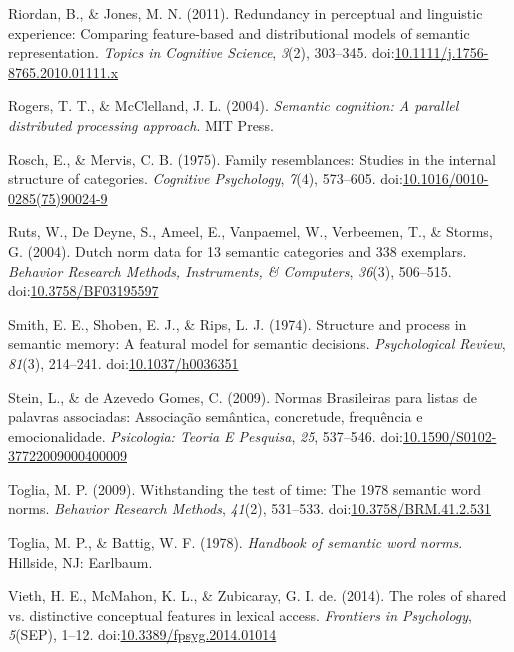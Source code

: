 \documentclass[english,,man]{apa6}
\begin{document}
\leavevmode\hypertarget{ref-Riordan2011}{}%
Riordan, B., \& Jones, M. N. (2011). Redundancy in perceptual and linguistic experience: Comparing feature-based and distributional models of semantic representation. \emph{Topics in Cognitive Science}, \emph{3}(2), 303--345. doi:\href{https://doi.org/10.1111/j.1756-8765.2010.01111.x}{10.1111/j.1756-8765.2010.01111.x}

\leavevmode\hypertarget{ref-Rogers2004}{}%
Rogers, T. T., \& McClelland, J. L. (2004). \emph{Semantic cognition: A parallel distributed processing approach}. MIT Press.

\leavevmode\hypertarget{ref-Rosch1975}{}%
Rosch, E., \& Mervis, C. B. (1975). Family resemblances: Studies in the internal structure of categories. \emph{Cognitive Psychology}, \emph{7}(4), 573--605. doi:\href{https://doi.org/10.1016/0010-0285(75)90024-9}{10.1016/0010-0285(75)90024-9}

\leavevmode\hypertarget{ref-Ruts2004}{}%
Ruts, W., De Deyne, S., Ameel, E., Vanpaemel, W., Verbeemen, T., \& Storms, G. (2004). Dutch norm data for 13 semantic categories and 338 exemplars. \emph{Behavior Research Methods, Instruments, \& Computers}, \emph{36}(3), 506--515. doi:\href{https://doi.org/10.3758/BF03195597}{10.3758/BF03195597}

\leavevmode\hypertarget{ref-Smith1974}{}%
Smith, E. E., Shoben, E. J., \& Rips, L. J. (1974). Structure and process in semantic memory: A featural model for semantic decisions. \emph{Psychological Review}, \emph{81}(3), 214--241. doi:\href{https://doi.org/10.1037/h0036351}{10.1037/h0036351}

\leavevmode\hypertarget{ref-Stein2009}{}%
Stein, L., \& de Azevedo Gomes, C. (2009). Normas Brasileiras para listas de palavras associadas: Associação semântica, concretude, frequência e emocionalidade. \emph{Psicologia: Teoria E Pesquisa}, \emph{25}, 537--546. doi:\href{https://doi.org/10.1590/S0102-37722009000400009}{10.1590/S0102-37722009000400009}

\leavevmode\hypertarget{ref-Toglia2009}{}%
Toglia, M. P. (2009). Withstanding the test of time: The 1978 semantic word norms. \emph{Behavior Research Methods}, \emph{41}(2), 531--533. doi:\href{https://doi.org/10.3758/BRM.41.2.531}{10.3758/BRM.41.2.531}

\leavevmode\hypertarget{ref-Toglia1978}{}%
Toglia, M. P., \& Battig, W. F. (1978). \emph{Handbook of semantic word norms}. Hillside, NJ: Earlbaum.

\leavevmode\hypertarget{ref-Vieth2014}{}%
Vieth, H. E., McMahon, K. L., \& Zubicaray, G. I. de. (2014). The roles of shared vs. distinctive conceptual features in lexical access. \emph{Frontiers in Psychology}, \emph{5}(SEP), 1--12. doi:\href{https://doi.org/10.3389/fpsyg.2014.01014}{10.3389/fpsyg.2014.01014}
\end{document}
